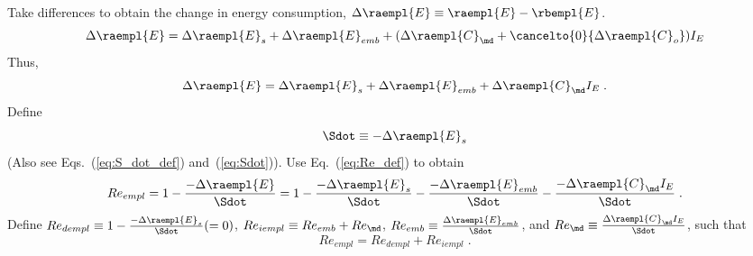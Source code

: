 \begin{landscape}
{Take differences to obtain the change in energy consumption, $\Delta \raempl{E} \equiv \raempl{E} - \rbempl{E}$.
%
\begin{equation}
  \Delta \raempl{E} = \Delta \raempl{E}_s
                      + \Delta \raempl{E}_{emb}
                      + (\Delta \raempl{C}_{\md}
                      + \cancelto{0}{\Delta \raempl{C}_o}) I_E
\end{equation}
%
Thus, 
%
\begin{equation}
\Delta \raempl{E} = \Delta \raempl{E}_s + \Delta \raempl{E}_{emb} + \Delta \raempl{C}_{\md} I_E \; .
\end{equation}
%
Define
%
\begin{equation} \label{eq:Sdot_def}
\Sdot \equiv -\Delta \raempl{E}_s
\end{equation}
%
(Also see Eqs.~(\ref{eq:S_dot_def}) and~(\ref{eq:Sdot})). 
Use Eq.~(\ref{eq:Re_def}) to obtain
%
\begin{equation}
Re_{empl} = 1 - \frac{-\Delta \raempl{E}}{\Sdot} 
          = 1 - \frac{-\Delta \raempl{E}_s}{\Sdot} 
              - \frac{-\Delta \raempl{E}_{emb}}{\Sdot}
              - \frac{-\Delta \raempl{C}_{\md} I_E}{\Sdot} \; .
\end{equation}
%
Define $Re_{dempl} \equiv 1 - \frac{-\Delta \raempl{E}_s}{\Sdot} (= 0)$, 
$Re_{iempl} \equiv Re_{emb} + Re_{\md}$, 
$Re_{emb} \equiv \frac{\Delta \raempl{E}_{emb}}{\Sdot}$, and
$Re_{\md} \equiv \frac{\Delta \raempl{C}_{\md} I_E}{\Sdot}$, 
such that
%
\begin{equation} \label{eq:Re_empl_def}
Re_{empl} = Re_{dempl} + Re_{iempl} \; .
\end{equation}
}
{
~
    
}
\end{landscape}
